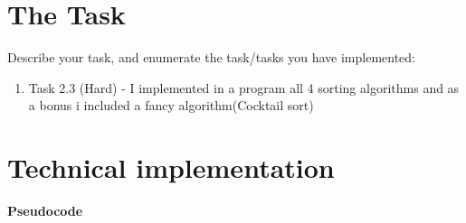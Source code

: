 \documentclass[12pt]{article}
\begin{document}
\section*{The Task}

Describe your task, and enumerate the task/tasks you have implemented:
\begin{enumerate}
  \item Task 2.3 (Hard) - I implemented in a program all 4 sorting algorithms and as a bonus i included a fancy algorithm(Cocktail sort)
  
\end{enumerate}


\section*{Technical implementation}
\textbf{Pseudocode}
\end{document}
